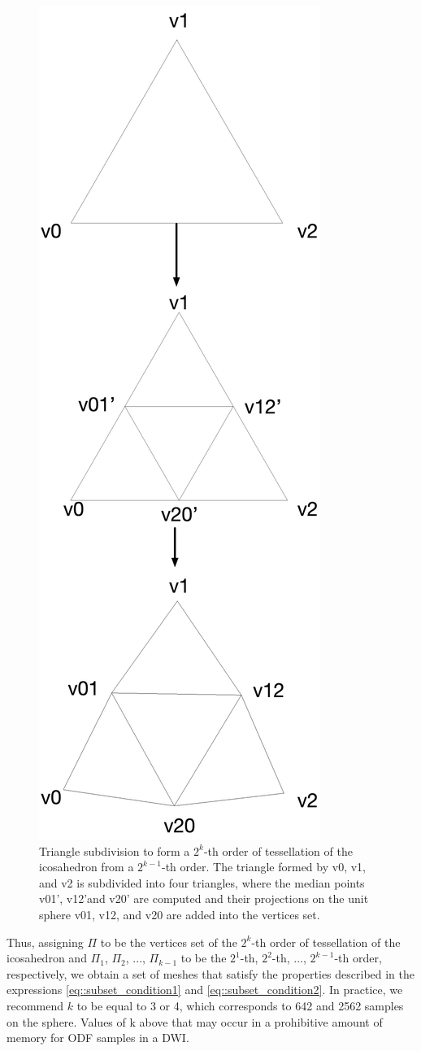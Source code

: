 \documentclass[twoside,twocolumn,10pt]{article}
\begin{document}
\begin{figure}[ht]
    \centering
    \includegraphics[width=.50\linewidth, angle=0]{figs/icosahedron_example/ico_subdivision_V.png}
    \caption{Triangle subdivision to form a $2^k$-th order of tessellation of the icosahedron from a $2^{k-1}$-th order. The triangle formed by v0, v1, and v2 is subdivided into four triangles, where the median points v01', v12'and v20' are computed and their projections on the unit sphere v01, v12, and v20 are added into the vertices set.
    }
    \label{fig::subdivision_icosahedron}
\end{figure}



Thus, assigning $\Pi$ to be the vertices set of the $2^k$-th order of tessellation of the icosahedron and $\Pi_1$, $\Pi_2$, ..., $\Pi_{k-1}$ to be the $2^{1}$-th, $2^{2}$-th, ..., $2^{k-1}$-th order, respectively, we obtain a set of meshes that satisfy the properties described in the expressions \ref{eq::subset_condition1} and \ref{eq::subset_condition2}. In practice, we recommend $k$ to be equal to 3 or 4, which corresponds to 642 and 2562 samples on the sphere. Values of k above that may occur in a prohibitive amount of memory for ODF samples in a DWI.
\end{document}
